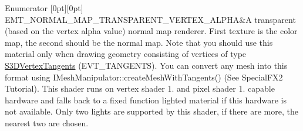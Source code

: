 \begin{DoxyEnumFields}{Enumerator}
[0pt][0pt]{}\mbox{\label{namespaceirr_1_1video_ac8e9b6c66f7cebabd1a6d30cbc5430f1a0d6f6973795d52d137955699537565db}} 
E\+M\+T\+\_\+\+N\+O\+R\+M\+A\+L\+\_\+\+M\+A\+P\+\_\+\+T\+R\+A\+N\+S\+P\+A\+R\+E\+N\+T\+\_\+\+V\+E\+R\+T\+E\+X\+\_\+\+A\+L\+P\+HA&A transparent (based on the vertex alpha value) normal map renderer. First texture is the color map, the second should be the normal map. Note that you should use this material only when drawing geometry consisting of vertices of type \hyperlink{structirr_1_1video_1_1S3DVertexTangents}{S3\+D\+Vertex\+Tangents} (E\+V\+T\+\_\+\+T\+A\+N\+G\+E\+N\+TS). You can convert any mesh into this format using I\+Mesh\+Manipulator\+::create\+Mesh\+With\+Tangents() (See Special\+F\+X2 Tutorial). This shader runs on vertex shader 1. and pixel shader 1. capable hardware and falls back to a fixed function lighted material if this hardware is not available. Only two lights are supported by this shader, if there are more, the nearest two are chosen. \\
\hline


\end{DoxyEnumFields}
